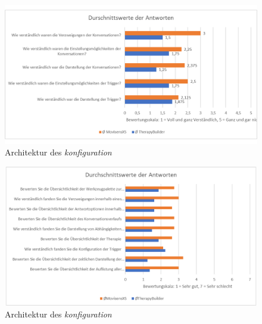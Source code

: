 \begin{figure}[h]
\centering
\includegraphics[width=1\textwidth]{pictures/diagramme/antwortendurchsch1}
\caption{Architektur des \emph{konfiguration}}
\label{therapyBuilder}
\end{figure}

\begin{figure}[h]
\centering
\includegraphics[width=1\textwidth]{pictures/diagramme/antwortendurchsch2}
\caption{Architektur des \emph{konfiguration}}
\label{therapyBuilder}
\end{figure}